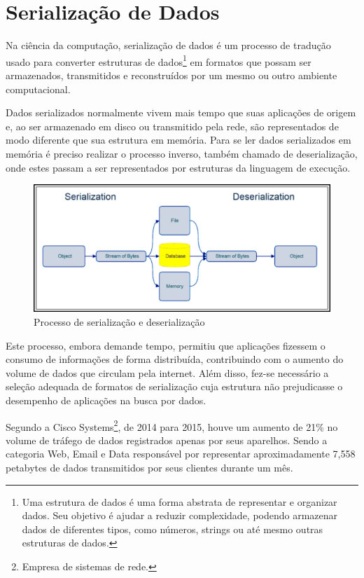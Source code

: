 \section[Serialização de Dados]{Serialização de Dados}

Na ciência da computação, serialização de dados é um processo de tradução usado para converter estruturas de dados\footnote{
  Uma estrutura de dados é uma forma abstrata de representar e organizar dados. Seu objetivo é ajudar a reduzir complexidade, podendo armazenar dados de diferentes tipos, como números, strings ou até mesmo outras estruturas de dados.
} em formatos que possam ser armazenados, transmitidos e reconstruídos por um mesmo ou outro ambiente computacional. \cite{Cline2016}

Dados serializados normalmente vivem mais tempo que suas aplicações de origem e, ao ser armazenado em disco ou transmitido pela rede, são representados de modo diferente que sua estrutura em memória. Para se ler dados serializados em memória é preciso realizar o processo inverso, também chamado de deserialização, onde estes passam a ser representados por estruturas da linguagem de execução. \cite{Guller2016}

\begin{figure}[H]
  \centering
  \includegraphics[width=\textwidth,height=\textheight,keepaspectratio]{figuras/data-serialization-deserialization.png}
  \caption{Processo de serialização e deserialização}
\end{figure}

Este processo, embora demande tempo, permitiu que aplicações fizessem o consumo de informações de forma distribuída, contribuindo com o aumento do volume de dados que circulam pela internet. Além disso, fez-se necessário a seleção adequada de formatos de serialização cuja estrutura não prejudicasse o desempenho de aplicações na busca por dados. \cite{SumarayMakki2012}

Segundo a Cisco Systems\footnote{
  Empresa de sistemas de rede.
}, de 2014 para 2015, houve um aumento de 21\% no volume de tráfego de dados registrados apenas por seus aparelhos. Sendo a categoria Web, Email e Data responsável por representar aproximadamente 7,558 petabytes de dados transmitidos por seus clientes durante um mês. \cite{Cisco2016}

